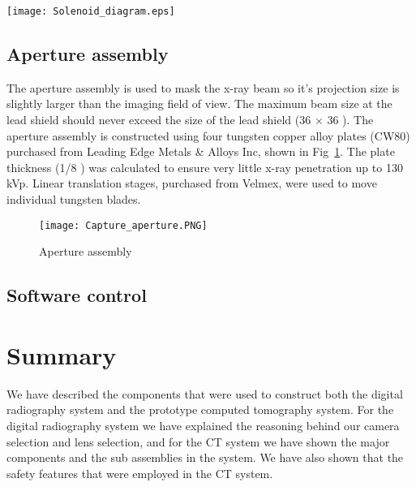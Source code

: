 \begin{sidewaysfigure}[h]
\centering
\texttt{[image: Solenoid\_diagram.eps]}
\caption{Schematic for the solenoid PCB board}
\label{fig:solenoid_schematic}
\end{sidewaysfigure}
		
\subsection{Aperture assembly}
The aperture assembly is used to mask the x-ray beam so it's projection size is slightly larger than the imaging field of view.  The maximum beam size at the lead shield should never exceed the size of the lead shield (36 \inches $\times$ 36 \inches).  The aperture assembly is constructed using four tungsten copper alloy plates (CW80) purchased from Leading Edge Metals \& Alloys Inc, shown in Fig~\ref{fig:aperture}.  The plate thickness (1/8 \inches) was calculated to ensure very little x-ray penetration up to 130 kVp.  Linear translation stages, purchased from Velmex, were used to move individual tungsten blades.

\begin{figure}[h]
\centering
\texttt{[image: Capture\_aperture.PNG]}
\caption{Aperture assembly}
\label{fig:aperture}
\end{figure}

\subsection{Software control}


\section{Summary}
We have described the components that were used to construct both the digital radiography system and the prototype computed tomography system.  For the digital radiography system we have explained the reasoning behind our camera selection and lens selection, and for the CT system we have shown the major components and the sub assemblies in the system.  We have also shown that the safety features that were employed in the CT system.  